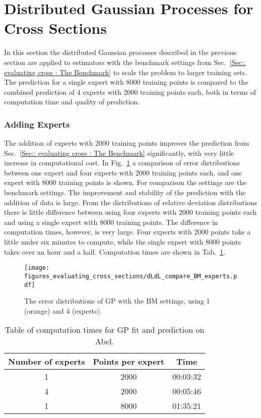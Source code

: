 \documentclass[twoside,english]{uiofysmaster}
\begin{document}
\section{Distributed Gaussian Processes \newline for Cross Sections}

In this section the distributed Gaussian processes described in the previous section are applied to estimators with the benchmark settings from Sec.~\ref{Sec:: evaluating cross : The Benchmark} to scale the problem to larger training sets. The prediction for a single expert with 8000 training points is compared to the combined prediction of 4 experts with 2000 training points each, both in terms of computation time and quality of prediction.

\subsubsection{Adding Experts}

The addition of experts with 2000 training points improves the prediction from Sec.~\ref{Sec:: evaluating cross : The Benchmark} significantly, with very little increase in computational cost. In Fig.~\ref{Fig:: evaluating cross : compare 1 vs 4 expert dLdL} a comparison of error distributions between one expert and four experts with 2000 training points each, and one expert with 8000 training points is shown.  For comparison the settings are the benchmark settings. The improvement and stability of the prediction with the addition of data is large. From the distributions of relative deviation distributions there is little difference between using four experts with 2000 training points each and using a single expert with 8000 training points. The difference in computation times, however, is very large. Four experts with 2000 points take a little under six minutes to compute, while the single expert with 8000 points takes over an hour and a half. Computation times are shown in Tab.~\ref{Tab:: evaluating cross : computation times experts BM}.

\begin{figure}
\centering
\texttt{[image: figures\_evaluating\_cross\_sections/dLdL\_compare\_BM\_experts.pdf]}
\caption{The error distributions of GP with the BM settings, using 1 (orange) and 4 (experts).}
\label{Fig:: evaluating cross : compare 1 vs 4 expert dLdL}
\end{figure}  

\begin{table}
\centering
\begin{tabular}{c|c|c}
Number of experts & Points per expert & Time\\
\hline
1 & 2000 & 00:03:32\\
4 & 2000 & 00:05:46\\
1 & 8000 & 01:35:21
\end{tabular}
\caption{Table of computation times for GP fit and prediction on Abel.}
\label{Tab:: evaluating cross : computation times experts BM}
\end{table}
\end{document}
